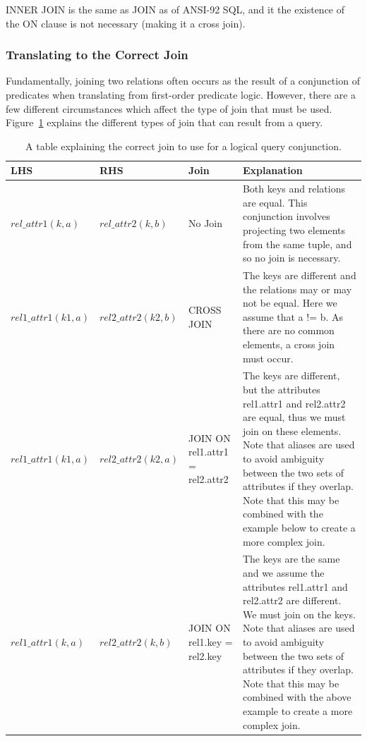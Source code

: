\documentclass[a4paper, 11pt]{article}
\begin{document}
      INNER JOIN is the same as JOIN as of ANSI-92 SQL, and it the existence of
      the ON clause is not necessary (making it a cross join).

    \subsubsection{Translating to the Correct Join}

      Fundamentally, joining two relations often occurs as the result of a
      conjunction of predicates when translating from first-order predicate
      logic. However, there are a few different circumstances which affect the
      type of join that must be used. Figure~\ref{fig:jointranslation} explains
      the different types of join that can result from a query.

      \begin{table}
        \label{fig:jointranslation}
        \begin{tabular}{ | p{} |
          p{} |
          p{} |
          p{} | } \hline
        LHS & RHS & Join & Explanation \\
        \hline
        $rel\_attr1(k, a)$ & $rel\_attr2(k, b)$ & No Join & 
        Both keys and relations are equal. This conjunction involves projecting
        two elements from the same tuple, and so no join is necessary.\\ \hline
        $rel1\_attr1(k1, a)$ & $rel2\_attr2(k2, b)$ & CROSS JOIN &
        The keys are different and the relations may or may not be equal. Here
        we assume that a != b. As there are no common elements, a cross join
        must occur.\\ \hline
        $rel1\_attr1(k1, a)$ & $rel2\_attr2(k2, a)$ & JOIN ON rel1.attr1 =
        rel2.attr2 &
        The keys are different, but the attributes rel1.attr1 and rel2.attr2
        are equal, thus we must join on these elements. Note that aliases are
        used to avoid ambiguity between the two sets of attributes if they
        overlap. Note that this may be combined with the example below to
        create a more complex join.\\ \hline
        $rel1\_attr1(k, a)$ & $rel2\_attr2(k, b)$ & JOIN ON rel1.key =
        rel2.key &
        The keys are the same and we assume the attributes rel1.attr1 and rel2.attr2
        are different. We must join on the keys. Note that aliases are
        used to avoid ambiguity between the two sets of attributes if they
        overlap. Note that this may be combined with the above example to
        create a more complex join.\\ \hline
      \end{tabular}
        \caption{A table explaining the correct join to use for a logical query
        conjunction.}
    \end{table}
\end{document}
